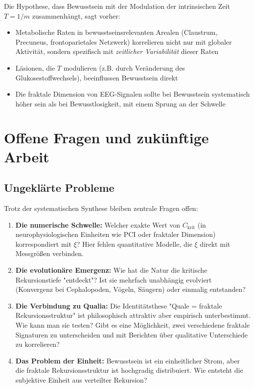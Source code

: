 \documentclass[11pt,a4paper]{article}
\begin{document}
	Die Hypothese, dass Bewusstsein mit der Modulation der intrinsischen Zeit \(T = 1/m\) zusammenhängt, sagt vorher:
	
	\begin{itemize}
		\item Metabolische Raten in bewusstseinsrelevanten Arealen (Claustrum, Precuneus, frontoparietales Netzwerk) korrelieren nicht nur mit globaler Aktivität, sondern spezifisch mit \emph{zeitlicher Variabilität} dieser Raten
		\item Läsionen, die \(T\) modulieren (z.B. durch Veränderung des Glukosestoffwechsels), beeinflussen Bewusstsein direkt
		\item Die fraktale Dimension von EEG-Signalen sollte bei Bewusstsein systematisch höher sein als bei Bewusstlosigkeit, mit einem Sprung an der Schwelle
	\end{itemize}
	
	\section{Offene Fragen und zukünftige Arbeit}
	\label{sec:offene_fragen}
	
	\subsection{Ungeklärte Probleme}
	
	Trotz der systematischen Synthese bleiben zentrale Fragen offen:
	
	\begin{enumerate}
		\item \textbf{Die numerische Schwelle:} Welcher exakte Wert von \(C_{\text{krit}}\) (in neurophysiologischen Einheiten wie PCI oder fraktaler Dimension) korrespondiert mit \(\xi\)? Hier fehlen quantitative Modelle, die \(\xi\) direkt mit Messgrößen verbinden.
		
		\item \textbf{Die evolutionäre Emergenz:} Wie hat die Natur die kritische Rekursionstiefe "entdeckt"? Ist sie mehrfach unabhängig evolviert (Konvergenz bei Cephalopoden, Vögeln, Säugern) oder einmalig entstanden?
		
		\item \textbf{Die Verbindung zu Qualia:} Die Identitätsthese "Quale = fraktale Rekursionsstruktur" ist philosophisch attraktiv aber empirisch unterbestimmt. Wie kann man sie testen? Gibt es eine Möglichkeit, zwei verschiedene fraktale Signaturen zu unterscheiden und mit Berichten über qualitative Unterschiede zu korrelieren?
		
		\item \textbf{Das Problem der Einheit:} Bewusstsein ist ein einheitlicher Strom, aber die fraktale Rekursionsstruktur ist hochgradig distribuiert. Wie entsteht die subjektive Einheit aus verteilter Rekursion?
	\end{enumerate}
	
\end{document}
